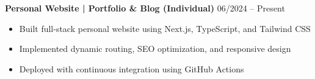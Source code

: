 \noindent
\textbf{Personal Website | Portfolio \& Blog (Individual)} \hfill 06/2024 -- Present
\begin{itemize}
    \item Built full-stack personal website using Next.js, TypeScript, and Tailwind CSS
    \item Implemented dynamic routing, SEO optimization, and responsive design
    \item Deployed with continuous integration using GitHub Actions
\end{itemize}
